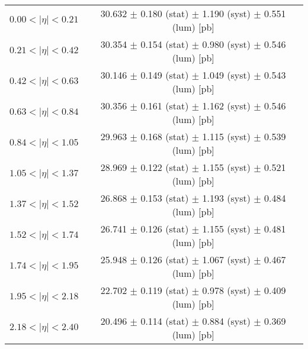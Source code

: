 \begin{tabular}{lc}
\hline
$0.00 < |\eta| <0.21$          & 30.632 $\pm$ 0.180 (stat) $\pm$ 1.190 (syst) $\pm$ 0.551 (lum) [pb]  \\
$0.21 < |\eta| <0.42$          & 30.354 $\pm$ 0.154 (stat) $\pm$ 0.980 (syst) $\pm$ 0.546 (lum) [pb]  \\
$0.42 < |\eta| <0.63$          & 30.146 $\pm$ 0.149 (stat) $\pm$ 1.049 (syst) $\pm$ 0.543 (lum) [pb]  \\
$0.63 < |\eta| <0.84$          & 30.356 $\pm$ 0.161 (stat) $\pm$ 1.162 (syst) $\pm$ 0.546 (lum) [pb]  \\
$0.84 < |\eta| <1.05$          & 29.963 $\pm$ 0.168 (stat) $\pm$ 1.115 (syst) $\pm$ 0.539 (lum) [pb]  \\
$1.05 < |\eta| <1.37$          & 28.969 $\pm$ 0.122 (stat) $\pm$ 1.155 (syst) $\pm$ 0.521 (lum) [pb]  \\
$1.37 < |\eta| <1.52$          & 26.868 $\pm$ 0.153 (stat) $\pm$ 1.193 (syst) $\pm$ 0.484 (lum) [pb]  \\
$1.52 < |\eta| <1.74$          & 26.741 $\pm$ 0.126 (stat) $\pm$ 1.155 (syst) $\pm$ 0.481 (lum) [pb]  \\
$1.74 < |\eta| <1.95$          & 25.948 $\pm$ 0.126 (stat) $\pm$ 1.067 (syst) $\pm$ 0.467 (lum) [pb]  \\
$1.95 < |\eta| <2.18$          & 22.702 $\pm$ 0.119 (stat) $\pm$ 0.978 (syst) $\pm$ 0.409 (lum) [pb]  \\
$2.18 < |\eta| <2.40$          & 20.496 $\pm$ 0.114 (stat) $\pm$ 0.884 (syst) $\pm$ 0.369 (lum) [pb]  \\
\hline
\end{tabular}
